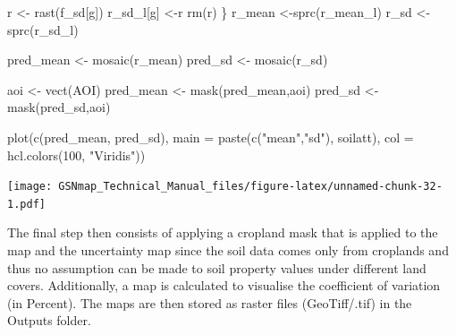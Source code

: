 \documentclass[
  10pt,
  b5paper,
  oneside]{book}
\newenvironment{Shaded}{\begin{snugshade}}{\end{snugshade}}
\newcommand{\AttributeTok}[1]{\textcolor[rgb]{0.77,0.63,0.00}{#1}}
\newcommand{\DecValTok}[1]{\textcolor[rgb]{0.00,0.00,0.81}{#1}}
\newcommand{\FunctionTok}[1]{\textcolor[rgb]{0.00,0.00,0.00}{#1}}
\newcommand{\NormalTok}[1]{#1}
\newcommand{\OtherTok}[1]{\textcolor[rgb]{0.56,0.35,0.01}{#1}}
\newcommand{\StringTok}[1]{\textcolor[rgb]{0.31,0.60,0.02}{#1}}
\begin{document}
\begin{Shaded}
\begin{Highlighting}[]
\NormalTok{    r }\OtherTok{\textless{}{-}} \FunctionTok{rast}\NormalTok{(f\_sd[g])}
\NormalTok{    r\_sd\_l[g] }\OtherTok{\textless{}{-}}\NormalTok{r}
    \FunctionTok{rm}\NormalTok{(r)}
\NormalTok{  \}}
\NormalTok{  r\_mean }\OtherTok{\textless{}{-}}\FunctionTok{sprc}\NormalTok{(r\_mean\_l)}
\NormalTok{  r\_sd }\OtherTok{\textless{}{-}}\FunctionTok{sprc}\NormalTok{(r\_sd\_l)}
  
\NormalTok{  pred\_mean }\OtherTok{\textless{}{-}} \FunctionTok{mosaic}\NormalTok{(r\_mean)}
\NormalTok{  pred\_sd }\OtherTok{\textless{}{-}} \FunctionTok{mosaic}\NormalTok{(r\_sd)}
  
\NormalTok{  aoi }\OtherTok{\textless{}{-}} \FunctionTok{vect}\NormalTok{(AOI)}
\NormalTok{  pred\_mean }\OtherTok{\textless{}{-}} \FunctionTok{mask}\NormalTok{(pred\_mean,aoi)}
\NormalTok{  pred\_sd }\OtherTok{\textless{}{-}} \FunctionTok{mask}\NormalTok{(pred\_sd,aoi)}
  
  
  \FunctionTok{plot}\NormalTok{(}\FunctionTok{c}\NormalTok{(pred\_mean, pred\_sd), }\AttributeTok{main =} \FunctionTok{paste}\NormalTok{(}\FunctionTok{c}\NormalTok{(}\StringTok{"mean"}\NormalTok{,}\StringTok{"sd"}\NormalTok{), soilatt), }
       \AttributeTok{col =} \FunctionTok{hcl.colors}\NormalTok{(}\DecValTok{100}\NormalTok{, }\StringTok{"Viridis"}\NormalTok{))}
\end{Highlighting}
\end{Shaded}

\texttt{[image: GSNmap\_Technical\_Manual\_files/figure-latex/unnamed-chunk-32-1.pdf]}

The final step then consists of applying a cropland mask that is applied to the map and the uncertainty map since the soil data comes only from croplands and thus no assumption can be made to soil property values under different land covers. Additionally, a map is calculated to visualise the coefficient of variation (in Percent). The maps are then stored as raster files (GeoTiff/.tif) in the Outputs folder.
\end{document}
